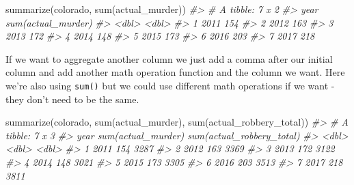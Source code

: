 \documentclass[
]{krantz}
\makeatletter
\newenvironment{Shaded}{\begin{snugshade}}{\end{snugshade}}
\newcommand{\CommentTok}[1]{\textcolor[rgb]{0.37,0.37,0.37}{\textit{#1}}}
\newcommand{\FunctionTok}[1]{\textcolor[rgb]{0,0,0}{#1}}
\newcommand{\NormalTok}[1]{#1}
\newenvironment{kframe}{%
\medskip{}
\setlength{\fboxsep}{.8em}
 \def\at@end@of@kframe{}%
 \ifinner\ifhmode%
  \def\at@end@of@kframe{\end{minipage}}%
  \begin{minipage}{\columnwidth}%
 \fi\fi%
 \def\FrameCommand##1{\hskip\@totalleftmargin \hskip-\fboxsep
 \colorbox{shadecolor}{##1}\hskip-\fboxsep
     \hskip-\linewidth \hskip-\@totalleftmargin \hskip\columnwidth}%
 \MakeFramed {\advance\hsize-\width
   \@totalleftmargin\z@ \linewidth\hsize
   \@setminipage}}%
 {\par\unskip\endMakeFramed%
 \at@end@of@kframe}
\renewenvironment{Shaded}{\begin{kframe}}{\end{kframe}}
\makeatother
\begin{document}
\begin{Shaded}
\begin{Highlighting}[]
\FunctionTok{summarize}\NormalTok{(colorado, }\FunctionTok{sum}\NormalTok{(actual\_murder))}
\CommentTok{\#\textgreater{} \# A tibble: 7 x 2}
\CommentTok{\#\textgreater{}    year \textasciigrave{}sum(actual\_murder)\textasciigrave{}}
\CommentTok{\#\textgreater{}   \textless{}dbl\textgreater{}                \textless{}dbl\textgreater{}}
\CommentTok{\#\textgreater{} 1  2011                  154}
\CommentTok{\#\textgreater{} 2  2012                  163}
\CommentTok{\#\textgreater{} 3  2013                  172}
\CommentTok{\#\textgreater{} 4  2014                  148}
\CommentTok{\#\textgreater{} 5  2015                  173}
\CommentTok{\#\textgreater{} 6  2016                  203}
\CommentTok{\#\textgreater{} 7  2017                  218}
\end{Highlighting}
\end{Shaded}

If we want to aggregate another column we just add a comma after our initial column and add another math operation function and the column we want. Here we're also using \texttt{sum()} but we could use different math operations if we want - they don't need to be the same.

\begin{Shaded}
\begin{Highlighting}[]
\FunctionTok{summarize}\NormalTok{(colorado, }\FunctionTok{sum}\NormalTok{(actual\_murder), }\FunctionTok{sum}\NormalTok{(actual\_robbery\_total))}
\CommentTok{\#\textgreater{} \# A tibble: 7 x 3}
\CommentTok{\#\textgreater{}    year \textasciigrave{}sum(actual\_murder)\textasciigrave{} \textasciigrave{}sum(actual\_robbery\_total)\textasciigrave{}}
\CommentTok{\#\textgreater{}   \textless{}dbl\textgreater{}                \textless{}dbl\textgreater{}                       \textless{}dbl\textgreater{}}
\CommentTok{\#\textgreater{} 1  2011                  154                        3287}
\CommentTok{\#\textgreater{} 2  2012                  163                        3369}
\CommentTok{\#\textgreater{} 3  2013                  172                        3122}
\CommentTok{\#\textgreater{} 4  2014                  148                        3021}
\CommentTok{\#\textgreater{} 5  2015                  173                        3305}
\CommentTok{\#\textgreater{} 6  2016                  203                        3513}
\CommentTok{\#\textgreater{} 7  2017                  218                        3811}
\end{Highlighting}
\end{Shaded}
\end{document}
